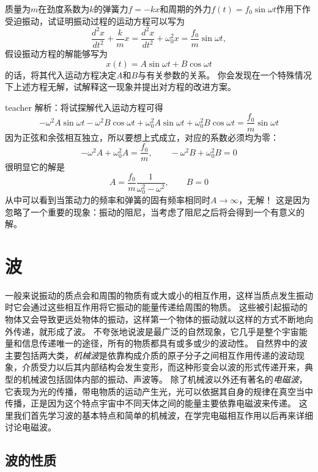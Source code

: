 \begin{example}
质量为$m$在劲度系数为$k$的弹簧力$f=-kx$和周期的外力$f(t)=f_0\sin\omega t$作用下作受迫振动，试证明振动过程的运动方程可以写为
\[
\frac{d^2x}{dt^2}+\frac{k}{m}x=\frac{d^2x}{dt^2}+\omega_0^2x=\frac{f_0}{m}\sin\omega t,
\]
假设振动方程的解能够写为
\[
x(t) = A\sin\omega t+B\cos\omega t
\]
的话，将其代入运动方程决定$A$和$B$与有关参数的关系。
你会发现在一个特殊情况下上述方程无解，试解释这一现象并提出对方程的改进方案。
\begin{taggedblock}{teacher}
\newline
解析：将试探解代入运动方程可得
\[
-\omega^2 A \sin\omega t-\omega^2 B\cos\omega t+\omega_0^2A\sin\omega t +\omega_0^2 B\cos\omega t=\frac{f_0}{m}\sin\omega t
\]
因为正弦和余弦相互独立，所以要想上式成立，对应的系数必须均为零：
\[
-\omega^2 A+\omega_0^2 A = \frac{f_0}{m},\qquad -\omega^2 B+\omega_0^2 B=0 
\]
很明显它的解是
\[
A = \frac{f_0}{m}\frac{1}{\omega_0^2-\omega^2},\qquad B=0
\]
从中可以看到当策动力的频率和弹簧的固有频率相同时$A\rightarrow \infty$，无解！
这是因为忽略了一个重要的现象：振动的阻尼，当考虑了阻尼之后将会得到一个有意义的解。
\end{taggedblock}
\end{example}







\section{波}
一般来说振动的质点会和周围的物质有或大或小的相互作用，这样当质点发生振动时它会通过这些相互作用将它振动的能量传递给周围的物质。
这些被引起振动的物体又会导致更远处物体的振动，这样第一个物体的振动就以这样的方式不断地向外传递，就形成了波。
不夸张地说波是最广泛的自然现象，它几乎是整个宇宙能量和信息传递唯一的途径，所有的物质都具有或多或少的波动性。
自然界中的波主要包括两大类，\emph{机械波}是依靠构成介质的原子分子之间相互作用传递的波动现象，介质受力以后其内部结构会发生变形，而这种形变会以波的形式传递开来，典型的机械波包括固体内部的振动、声波等。
除了机械波以外还有著名的\emph{电磁波}，它表现为光的传播，带电物质的运动产生光，光可以依据其自身的规律在真空当中传播，正是因为这个特点宇宙中不同天体之间的能量主要依靠电磁波来传递。
这里我们首先学习波的基本特点和简单的机械波，在学完电磁相互作用以后再来详细讨论电磁波。

\subsection{波的性质}

